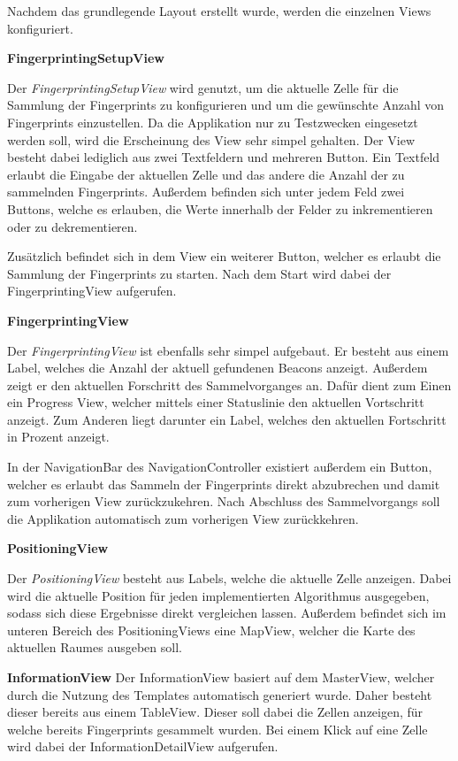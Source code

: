 Nachdem das grundlegende Layout erstellt wurde, werden die einzelnen Views konfiguriert.

\textbf{FingerprintingSetupView}


Der \emph{FingerprintingSetupView} wird genutzt, um die aktuelle Zelle für die Sammlung der Fingerprints zu konfigurieren und um die gewünschte Anzahl von Fingerprints einzustellen. Da die Applikation nur zu Testzwecken eingesetzt werden soll, wird die Erscheinung des View sehr simpel gehalten. 
Der View besteht dabei lediglich aus zwei Textfeldern und mehreren Button. 
Ein Textfeld erlaubt die Eingabe der aktuellen Zelle und das andere die Anzahl der zu sammelnden Fingerprints.
Außerdem befinden sich unter jedem Feld zwei Buttons, welche es erlauben, die Werte innerhalb der Felder zu inkrementieren oder zu dekrementieren.

Zusätzlich befindet sich in dem View ein weiterer Button, welcher es erlaubt die Sammlung der Fingerprints zu starten. 
Nach dem Start wird dabei der FingerprintingView aufgerufen.


\textbf{FingerprintingView}

Der \emph{FingerprintingView} ist ebenfalls sehr simpel aufgebaut.
Er besteht aus einem Label, welches die Anzahl der aktuell gefundenen Beacons anzeigt.
Außerdem zeigt er den aktuellen Forschritt des Sammelvorganges an. Dafür dient zum Einen ein Progress View, welcher mittels einer Statuslinie den aktuellen Vortschritt anzeigt. Zum Anderen liegt darunter ein Label, welches den aktuellen Fortschritt in Prozent anzeigt.

In der NavigationBar des NavigationController existiert außerdem ein Button, welcher es erlaubt das Sammeln der Fingerprints direkt abzubrechen und damit zum vorherigen View zurückzukehren. Nach Abschluss des Sammelvorgangs soll die Applikation automatisch zum vorherigen View zurückkehren.


\textbf{PositioningView}

Der \emph{PositioningView} besteht aus Labels, welche die aktuelle Zelle anzeigen. Dabei wird die aktuelle Position für jeden implementierten Algorithmus ausgegeben, sodass sich diese Ergebnisse direkt vergleichen lassen. Außerdem befindet sich im unteren Bereich des PositioningViews eine MapView, welcher die Karte des aktuellen Raumes ausgeben soll.


\textbf{InformationView} 
Der InformationView basiert auf dem MasterView, welcher durch die Nutzung des Templates automatisch generiert wurde. Daher besteht dieser bereits aus einem TableView.
Dieser soll dabei die Zellen anzeigen, für welche bereits Fingerprints gesammelt wurden. Bei einem Klick auf eine Zelle wird dabei der InformationDetailView aufgerufen.

